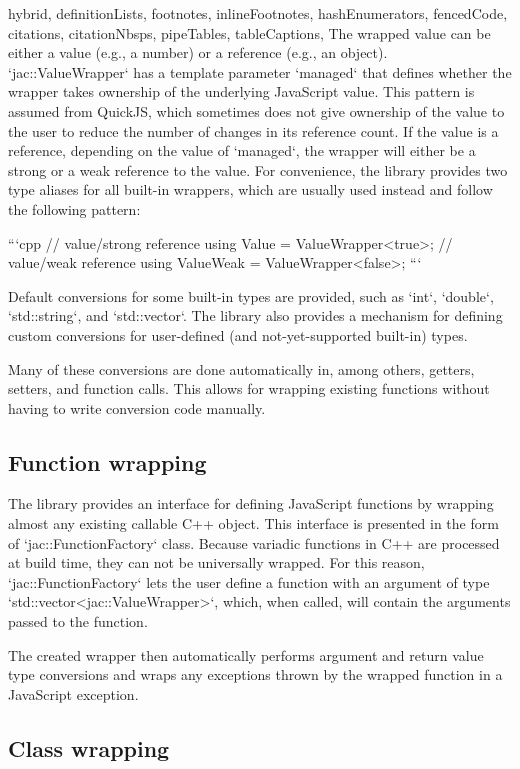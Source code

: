 \documentclass[
  digital,
  oneside,
  nosansbold,
  nocolorbold,
  lof,
  lot
]{fithesis4}
\begin{document}
\begin{markdown*}{%
  hybrid,
  definitionLists,
  footnotes,
  inlineFootnotes,
  hashEnumerators,
  fencedCode,
  citations,
  citationNbsps,
  pipeTables,
  tableCaptions,
}
The wrapped value can be either a value (e.g., a number) or a reference (e.g., an object).
`jac::ValueWrapper` has a template parameter `managed` that defines whether the wrapper takes ownership of the underlying JavaScript value. This pattern is assumed from QuickJS, which sometimes does not give ownership of the value to the user to reduce the number of changes in its reference count. If the value is a reference, depending on the value of `managed`, the wrapper will either be a strong or a weak reference to the value. For convenience, the library provides two type aliases for all built-in wrappers, which are usually used instead and follow the following pattern:

```cpp
// value/strong reference
using Value = ValueWrapper<true>;
// value/weak reference
using ValueWeak = ValueWrapper<false>;
```

Default conversions for some built-in types are provided, such as `int`, `double`, `std::string`, and `std::vector`. The library also provides a mechanism for defining custom conversions for user-defined (and not-yet-supported built-in) types.

Many of these conversions are done automatically in, among others, getters, setters, and function calls. This allows for wrapping existing functions without having to write conversion code manually.

\subsection{Function wrapping}

The library provides an interface for defining JavaScript functions by wrapping almost any existing callable C++ object. This interface is presented in the form of `jac::FunctionFactory` class. Because variadic functions in C++ are processed at build time, they can not be universally wrapped. For this reason, `jac::FunctionFactory` lets the user define a function with an argument of type `std::vector<jac::ValueWrapper>`, which, when called, will contain the arguments passed to the function.

The created wrapper then automatically performs argument and return value type conversions and wraps any exceptions thrown by the wrapped function in a JavaScript exception.

\subsection{Class wrapping}


\end{markdown*}
\end{document}
